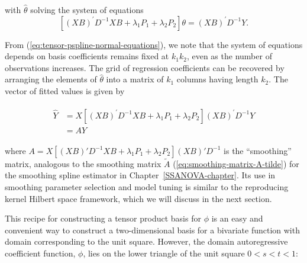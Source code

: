 \noindent
with $\hat{\theta}$ solving the system of equations 
\begin{equation} \label{eq:tensor-pspline-normal-equations}
\left[ \left(XB\right)^\prime D^{-1} XB +  \lambda_1 P_1+ \lambda_2 P_2\right]\theta = \left(X B\right)^\prime D^{-1}Y.
\end{equation}

\noindent
From (\ref{eq:tensor-pspline-normal-equations}), we note that the system of equations depends on basis coefficients remains fixed at $k_1 k_2$, even as the number of observations increases. The grid of regression coefficients can be recovered by arranging the elements of $\hat{\theta}$ into a matrix of $k_1$ columns having length $k_2$. The vector of fitted values is given by 

\begin{align}
\begin{split} \label{eq:pspline-smoothing-matrix}
\hat{Y} &= X \left[ \left(XB\right)^\prime D^{-1} XB +  \lambda_1 P_1+ \lambda_2 P_2\right] \left(X B\right)^\prime D^{-1}Y\\
&= AY
\end{split}
\end{align}

\noindent
where $A = X \left[ \left(XB\right)' D^{-1} XB +  \lambda_1 P_1+ \lambda_2 P_2\right] \left(X B\right)' D^{-1}$ is the ``smoothing'' matrix, analogous to the smoothing matrix $\tilde{A}$ (\ref{eq:smoothing-matrix-A-tilde}) for the smoothing spline estimator in Chapter~\ref{SSANOVA-chapter}. Its use in smoothing parameter selection and model tuning is similar to the reproducing kernel Hilbert space framework, which we will discuss in the next section.

\bigskip

This recipe for constructing a tensor product basis for $\phi$ is an easy and convenient way to construct a two-dimensional basis for a bivariate function with domain corresponding to the unit square. However, the domain autoregressive coefficient function, $\phi$, lies on the lower triangle of the unit square $0 < s < t < 1$:


